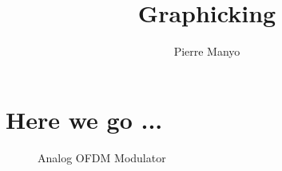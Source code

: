 \documentclass[a4paper,12pt]{article}
\title{Graphicking}
\author{Pierre Manyo}
\begin{document}
\maketitle

\begin{abstract}

\end{abstract}

\section{Here we go ...}
\begin{figure}[h!]
	\centerline{\resizebox{16cm}{!}{}}
	\caption{Analog OFDM Modulator}
\end{figure}
\end{document}
